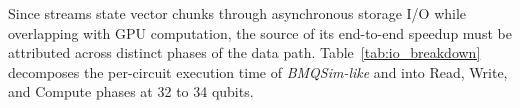 Since \EdgeQuantum streams state vector chunks through asynchronous storage I/O while overlapping with GPU computation, the source of its end-to-end speedup must be attributed across distinct phases of the data path. Table~\ref{tab:io_breakdown} decomposes the per-circuit execution time of \textit{BMQSim-like} and \EdgeQuantum into Read, Write, and Compute phases at 32 to 34 qubits.

